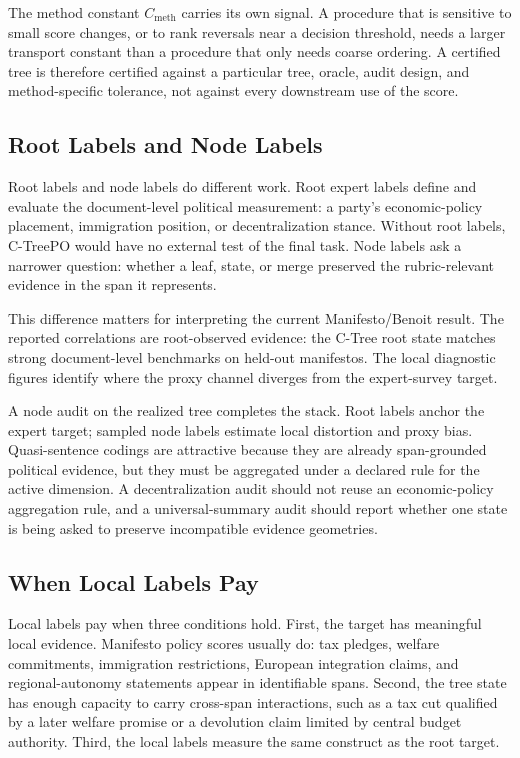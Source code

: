 The method constant \(C_{\mathrm{meth}}\) carries its own signal. A
procedure that is sensitive to small score changes, or to rank
reversals near a decision threshold, needs a larger transport
constant than a procedure that only needs coarse ordering. A
certified tree is therefore certified against a particular tree,
oracle, audit design, and method-specific tolerance, not against
every downstream use of the score.

\subsection{Root Labels and Node Labels}

Root labels and node labels do different work. Root expert labels define and
evaluate the document-level political measurement: a party's economic-policy
placement, immigration position, or decentralization stance. Without
root labels, C-TreePO would have no external test of the final task.
Node labels ask a narrower question: whether a leaf, state, or merge preserved the
rubric-relevant evidence in the span it represents.

This difference matters for interpreting the current Manifesto/Benoit
result. The reported correlations are root-observed evidence: the
C-Tree root state matches strong document-level benchmarks on
held-out manifestos. The local diagnostic figures identify where the
proxy channel diverges from the expert-survey target.

A node audit on the realized tree completes the stack. Root labels
anchor the expert target; sampled node labels estimate local
distortion and proxy bias. Quasi-sentence codings are attractive
because they are already span-grounded political evidence, but they
must be aggregated under a declared rule for the active dimension. A
decentralization audit should not reuse an economic-policy
aggregation rule, and a universal-summary audit should report whether
one state is being asked to preserve incompatible evidence
geometries.

\subsection{When Local Labels Pay}

Local labels pay when three conditions hold. First, the target has meaningful
local evidence. Manifesto policy scores usually do: tax pledges, welfare
commitments, immigration restrictions, European integration claims, and
regional-autonomy statements appear in identifiable spans. Second, the tree
state has enough capacity to carry cross-span interactions, such as a tax cut
qualified by a later welfare promise or a devolution claim limited by central
budget authority. Third, the local labels measure the same construct as the
root target.

